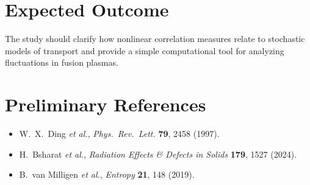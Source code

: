 \documentclass[12pt]{article}
\begin{document}
\section*{Expected Outcome}
The study should clarify how nonlinear correlation measures relate to stochastic models of transport and provide a simple computational tool for analyzing fluctuations in fusion plasmas.

\section*{Preliminary References}
\begin{itemize}
    \item W.\ X.\ Ding \textit{et al.}, \textit{Phys.\ Rev.\ Lett.} \textbf{79}, 2458 (1997).
    \item H.\ Bsharat \textit{et al.}, \textit{Radiation Effects \& Defects in Solids} \textbf{179}, 1527 (2024).
    \item B.\ van Milligen \textit{et al.}, \textit{Entropy} \textbf{21}, 148 (2019).
\end{itemize}
\end{document}
